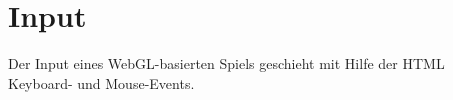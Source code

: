 \chapter{Input}

Der Input eines WebGL-basierten Spiels geschieht mit Hilfe der HTML Keyboard- und Mouse-Events.